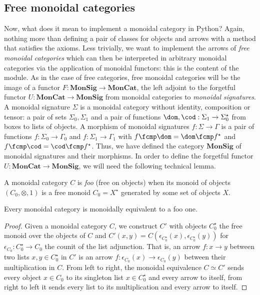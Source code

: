 \subsection{Free monoidal categories}

Now, what does it mean to implement a monoidal category in Python?
Again, nothing more than defining a pair of classes for objects and arrows with a  method that satisfies the axioms.
Less trivially, we want to implement the arrows of \emph{free monoidal categories} which can then be interpreted in arbitrary monoidal categories via the application of monoidal functors: this is the content of the  module.
As in the case of free categories, free monoidal categories will be the image of a functor $F : \mathbf{MonSig} \to \mathbf{MonCat}$, the left adjoint to the forgetful functor $U : \mathbf{MonCat} \to \mathbf{MonSig}$ from monoidal categories to \emph{monoidal signatures}.
A monoidal signature $\Sigma$ is a monoidal category without identity, composition or tensor: a pair of sets $\Sigma_0, \Sigma_1$ and a pair of functions $\dom, \cod : \Sigma_1 \to \Sigma_0^\star$ from boxes to lists of objects.
A morphism of monoidal signatures $f : \Sigma \to \Gamma$ is a pair of functions $f : \Sigma_0 \to \Gamma_0$ and $f : \Sigma_1 \to \Gamma_1$ with $f \fcmp \dom = \dom \fcmp f^\star$ and $f \fcmp \cod = \cod \fcmp f^\star$.
Thus, we have defined the category $\mathbf{MonSig}$ of monoidal signatures and their morphisms.
In order to define the forgetful functor $U : \mathbf{MonCat} \to \mathbf{MonSig}$, we will need the following technical lemma.

\begin{definition}
A monoidal category $C$ is \emph{foo} (free on objects) when its monoid of objects $(C_0, \otimes, 1)$ is a free monoid $C_0 = X^\star$ generated by some set of objects $X$.
\end{definition}

\begin{lemma}
Every monoidal category is monoidally equivalent to a foo one.
\end{lemma}

\begin{proof}
Given a monoidal category $C$, we construct $C'$ with objects $C_0^\star$ the free monoid over the objects of $C$ and $C'(x, y) = C(\epsilon_{C_0^\star}(x), \epsilon_{C_0^\star}(y))$ for $\epsilon_{C_0} : C_0^\star \to C_0$ the counit of the list adjunction.
That is, an arrow $f : x \to y$ between two lists $x, y \in C_0^\star$ in $C'$ is an arrow $f : \epsilon_{C_0}(x) \to \epsilon_{C_0}(y)$ between their multiplication in $C$.
From left to right, the monoidal equivalence $C \simeq C'$ sends every object $x \in C_0$ to its singleton list $x \in C_0^\star$ and every arrow to itself, from right to left it sends every list to its multiplication and every arrow to itself.
\end{proof}

